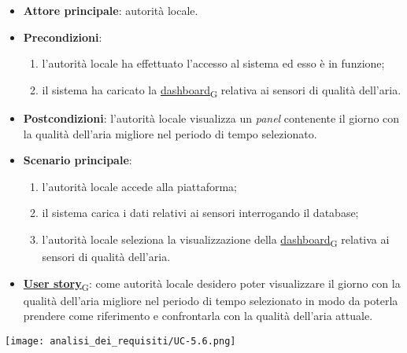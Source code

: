\begin{itemize}
	\item \textbf{Attore principale}: autorità locale.
	\item \textbf{Precondizioni}:
	      \begin{enumerate}
		      \item l'autorità locale ha effettuato l'accesso al sistema ed esso è in funzione;
		      \item il sistema ha caricato la \href{https://7last.github.io/docs/rtb/documentazione-interna/glossario\#dashboard}{dashboard\textsubscript{G}} relativa ai sensori di qualità dell'aria.
	      \end{enumerate}
	\item \textbf{Postcondizioni}: l'autorità locale visualizza un \textit{panel} contenente il giorno con la qualità dell'aria migliore nel periodo di tempo selezionato.
	\item \textbf{Scenario principale}:
	      \begin{enumerate}
		      \item l'autorità locale accede alla piattaforma;
		      \item il sistema carica i dati relativi ai sensori interrogando il database;
		      \item l'autorità locale seleziona la visualizzazione della \href{https://7last.github.io/docs/rtb/documentazione-interna/glossario\#dashboard}{dashboard\textsubscript{G}} relativa ai sensori di qualità dell'aria.
	      \end{enumerate}
	\item \href{https://7last.github.io/docs/rtb/documentazione-interna/glossario\#user-story}{\textbf{User story}\textsubscript{G}}:
	      come autorità locale desidero poter visualizzare il giorno con la qualità dell'aria migliore nel periodo di tempo selezionato
	      in modo da poterla prendere come riferimento e confrontarla con la qualità dell'aria attuale.
\end{itemize}
\begin{center}
	\texttt{[image: analisi\_dei\_requisiti/UC-5.6.png]}
\end{center}


